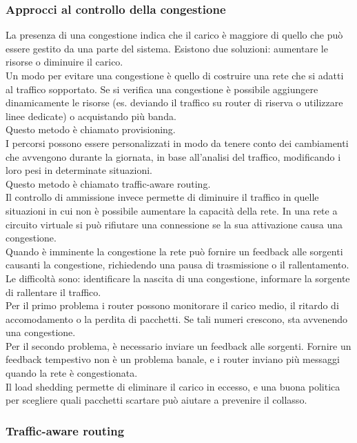 \documentclass{article}
\begin{document}
\subsubsection{Approcci al controllo della congestione}
La presenza di una congestione indica che il carico è maggiore di quello che può essere gestito da una parte del sistema. Esistono due soluzioni: aumentare le risorse o diminuire il carico.\\
Un modo per evitare una congestione è quello di costruire una rete che si adatti al traffico sopportato. Se si verifica una congestione è possibile aggiungere dinamicamente le risorse (es. deviando il traffico su router di riserva o utilizzare linee dedicate) o acquistando più banda.\\
Questo metodo è chiamato provisioning.\\
I percorsi possono essere personalizzati in modo da tenere conto dei cambiamenti che avvengono durante la giornata, in base all'analisi del traffico, modificando i loro pesi in determinate situazioni. \\
Questo metodo è chiamato traffic-aware routing.\\
Il controllo di ammissione invece permette di diminuire il traffico in quelle situazioni in cui non è possibile aumentare la capacità della rete. In una rete a circuito virtuale si può rifiutare una connessione se la sua attivazione causa una congestione.\\
Quando è imminente la congestione la rete può fornire un feedback alle sorgenti causanti la congestione, richiedendo una pausa di trasmissione o il rallentamento.\\
Le difficoltà sono: identificare la nascita di una congestione, informare la sorgente di rallentare il traffico. \\
Per il primo problema i router possono monitorare il carico medio, il ritardo di accomodamento o la perdita di pacchetti. Se tali numeri crescono, sta avvenendo una congestione.\\
Per il secondo problema, è necessario inviare un feedback alle sorgenti. Fornire un feedback tempestivo non è un problema banale, e i router inviano più messaggi quando la rete è congestionata. \\
Il load shedding permette di eliminare il carico in eccesso, e una buona politica per scegliere quali pacchetti scartare può aiutare a prevenire il collasso.
\subsubsection{Traffic-aware routing}
\end{document}
